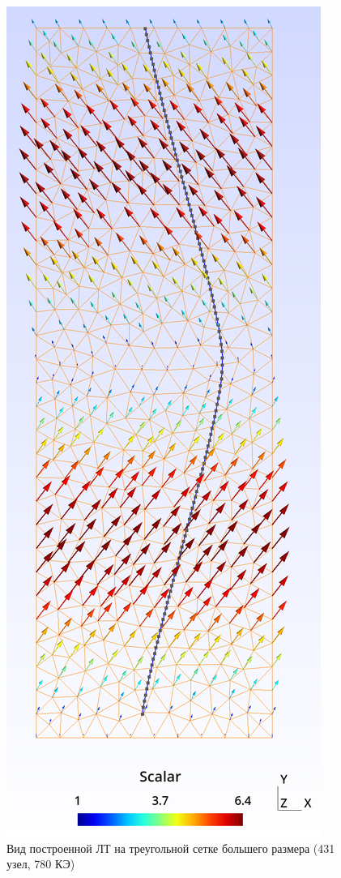 \begin{figure}[H]
	\centering
	\includegraphics[height=.9\textheight]{img/t1}
	\caption{Вид построенной ЛТ на треугольной сетке большего размера (431 узел, 780 КЭ)}
	\label{fig:t1}
\end{figure}
